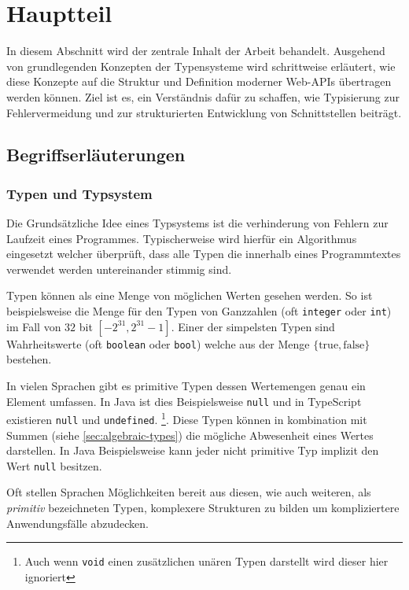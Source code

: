 \section{Hauptteil}

In diesem Abschnitt wird der zentrale Inhalt der Arbeit behandelt.
Ausgehend von grundlegenden Konzepten der Typensysteme wird schrittweise erläutert, 
wie diese Konzepte auf die Struktur und Definition moderner Web-APIs übertragen werden können.
Ziel ist es, ein Verständnis dafür zu schaffen, wie Typisierung zur Fehlervermeidung und zur 
strukturierten Entwicklung von Schnittstellen beiträgt.

\subsection{Begriffserläuterungen}

\subsubsection{Typen und Typsystem}

Die Grundsätzliche Idee eines Typsystems ist die verhinderung von Fehlern zur
Laufzeit eines Programmes. Typischerweise wird hierfür ein Algorithmus eingesetzt welcher überprüft,
dass alle Typen die innerhalb eines Programmtextes verwendet werden untereinander stimmig sind.

Typen können als eine Menge von möglichen Werten gesehen werden. So ist beispielsweise die Menge
für den Typen von Ganzzahlen (oft \texttt{integer} oder \texttt{int}) im Fall von $32$ bit
$[-2^{31},2^{31}-1]$.
Einer der simpelsten Typen sind Wahrheitswerte (oft \texttt{boolean} oder \texttt{bool}) welche aus 
der Menge $\{\text{true}, \text{false}\}$ bestehen.

In vielen Sprachen gibt es primitive Typen dessen Wertemengen genau ein Element umfassen. In Java ist dies Beispielsweise
\texttt{null} und in TypeScript existieren \texttt{null} und \texttt{undefined}. \footnote{Auch wenn \texttt{void} einen zusätzlichen unären Typen darstellt wird dieser hier ignoriert}. Diese Typen können in kombination mit Summen (siehe \ref{sec:algebraic-types}) die mögliche Abwesenheit eines Wertes darstellen.
In Java Beispielsweise kann jeder nicht primitive Typ implizit den Wert \texttt{null} besitzen.

Oft stellen Sprachen Möglichkeiten bereit aus diesen, wie auch weiteren,
als \textit{primitiv} bezeichneten Typen, komplexere Strukturen zu bilden um kompliziertere Anwendungsfälle
abzudecken.

